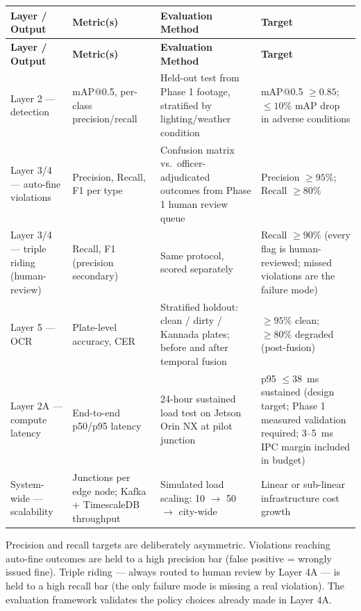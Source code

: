 \documentclass[11pt,a4paper]{article}
\begin{document}
\begin{longtable}{L{3.5cm} L{3cm} L{4.5cm} L{3.5cm}}
    \toprule
    \color{white}\textbf{Layer / Output} & \color{white}\textbf{Metric(s)} & \color{white}\textbf{Evaluation Method} & \color{white}\textbf{Target} \\
    \midrule
    \endfirsthead
    \toprule
    \color{white}\textbf{Layer / Output} & \color{white}\textbf{Metric(s)} & \color{white}\textbf{Evaluation Method} & \color{white}\textbf{Target} \\
    \midrule
    \endhead
    \bottomrule
    \endfoot

    Layer 2 — detection & mAP@0.5, per-class precision/recall & Held-out test from Phase 1 footage, stratified by lighting/weather condition & mAP@0.5 $\geq 0.85$; $\leq 10\%$ mAP drop in adverse conditions \\
    Layer 3/4 — auto-fine violations & Precision, Recall, F1 per type & Confusion matrix vs.\ officer-adjudicated outcomes from Phase 1 human review queue & Precision $\geq 95\%$; Recall $\geq 80\%$ \\
    Layer 3/4 — triple riding (human-review) & Recall, F1 (precision secondary) & Same protocol, scored separately & Recall $\geq 90\%$ (every flag is human-reviewed; missed violations are the failure mode) \\
    Layer 5 — OCR & Plate-level accuracy, CER & Stratified holdout: clean / dirty / Kannada plates; before and after temporal fusion & $\geq 95\%$ clean; $\geq 80\%$ degraded (post-fusion) \\
    Layer 2A — compute latency & End-to-end p50/p95 latency & 24-hour sustained load test on Jetson Orin NX at pilot junction & p95 $\leq 38$~ms sustained (design target; Phase 1 measured validation required; 3--5~ms IPC margin included in budget) \\
    System-wide — scalability & Junctions per edge node; Kafka + TimescaleDB throughput & Simulated load scaling: 10 $\rightarrow$ 50 $\rightarrow$ city-wide & Linear or sub-linear infrastructure cost growth \\
\end{longtable}

Precision and recall targets are deliberately asymmetric. Violations reaching auto-fine outcomes are held to a high precision bar (false positive = wrongly issued fine). Triple riding — always routed to human review by Layer 4A — is held to a high recall bar (the only failure mode is missing a real violation). The evaluation framework validates the policy choices already made in Layer 4A.
\end{document}
